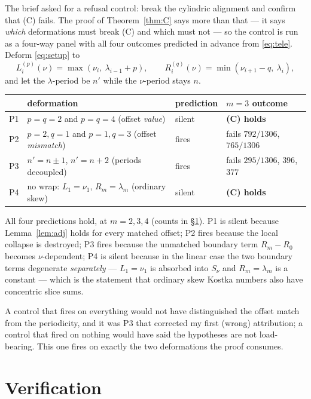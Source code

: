 \documentclass[11pt]{article}
\theoremstyle{definition}
\begin{document}
The brief asked for a refusal control: break the cylindric alignment and confirm that (C)
fails. The proof of Theorem~\ref{thm:C} says more than that --- it says \emph{which}
deformations must break (C) and which must not --- so the control is run as a four-way
panel with all four outcomes predicted in advance from \eqref{eq:tele}. Deform
\eqref{eq:setup} to
\[
  L_i^{(p)}(\nu)=\max(\nu_i,\ \lambda_{i-1}+p),\qquad
  R_i^{(q)}(\nu)=\min(\nu_{i+1}-q,\ \lambda_i),
\]
and let the $\lambda$-period be $n'$ while the $\nu$-period stays $n$.

\begin{center}
\begin{tabular}{llll}
 & deformation & prediction & $m=3$ outcome\\\hline
P1 & $p=q=2$ and $p=q=4$ (offset \emph{value}) & silent & \textbf{(C) holds}\\
P2 & $p=2,q=1$ and $p=1,q=3$ (offset \emph{mismatch}) & fires & fails $792/1306$, $765/1306$\\
P3 & $n'=n\pm1$, $n'=n+2$ (periods decoupled) & fires & fails $295/1306$, $396$, $377$\\
P4 & no wrap: $L_1=\nu_1$, $R_m=\lambda_m$ (ordinary skew) & silent & \textbf{(C) holds}\\
\end{tabular}
\end{center}

All four predictions hold, at $m=2,3,4$ (counts in §\ref{sec:verif}). P1 is silent because
Lemma~\ref{lem:adj} holds for every matched offset; P2 fires because the local collapse is
destroyed; P3 fires because the unmatched boundary term $R_m-R_0$ becomes $\nu$-dependent;
P4 is silent because in the linear case the two boundary terms degenerate \emph{separately}
--- $L_1=\nu_1$ is absorbed into $S_\nu$ and $R_m=\lambda_m$ is a constant --- which is the
statement that ordinary skew Kostka numbers also have concentric slice sums.

A control that fires on everything would not have distinguished the offset match from the
periodicity, and it was P3 that corrected my first (wrong) attribution; a control that
fired on nothing would have said the hypotheses are not load-bearing. This one fires on
exactly the two deformations the proof consumes.

\section{Verification}\label{sec:verif}
\end{document}
